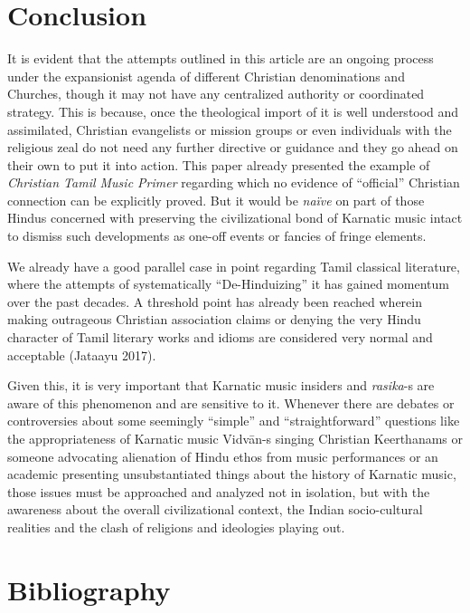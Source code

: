 \section*{Conclusion}

It is evident that the attempts outlined in this article are an ongoing process under the expansionist agenda of different Christian denominations and Churches, though it may not have any centralized authority or coordinated strategy. This is because, once the theological import of it is well understood and assimilated, Christian evangelists or mission groups or even individuals with the religious zeal do not need any further directive or guidance and they go ahead on their own to put it into action. This paper already presented the example of \textit{Christian Tamil Music Primer} regarding which no evidence of “official” Christian connection can be explicitly proved. But it would be \textit{naïve} on part of those Hindus concerned with preserving the civilizational bond of Karnatic music intact to dismiss such developments as one-off events or fancies of fringe elements.

We already have a good parallel case in point regarding Tamil classical literature, where the attempts of systematically “De-Hinduizing” it has gained momentum over the past decades. A threshold point has already been reached wherein making outrageous Christian association claims or denying the very Hindu character of Tamil literary works and idioms are considered very normal and acceptable (Jataayu 2017).

Given this, it is very important that Karnatic music insiders and \textit{rasika}-s are aware of this phenomenon and are sensitive to it. Whenever there are debates or controversies about some seemingly “simple” and “straightforward” questions like the appropriateness of Karnatic music Vidvān-s singing Christian Keerthanams or someone advocating alienation of Hindu ethos from music performances or an academic presenting unsubstantiated things about the history of Karnatic music, those issues must be approached and analyzed not in isolation, but with the awareness about the overall civilizational context, the Indian socio-cultural realities and the clash of religions and ideologies playing out.


\section*{Bibliography}

